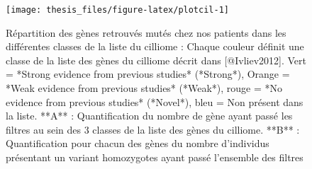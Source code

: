 \documentclass[12pt,twoside]{reedthesis}
\theoremstyle{definition}
\theoremstyle{definition}
\theoremstyle{remark}
\begin{document}
  \newpage 
  
  \begin{figure}
  
  {\centering \texttt{[image: thesis\_files/figure-latex/plotcil-1]} 
  
  }
  
  \caption[Répartition des gènes retrouvés mutés chez nos patients dans les différentes classes de la liste du cilliome]{Répartition des gènes retrouvés mutés chez nos patients dans les différentes classes de la liste du cilliome : Chaque couleur définit une classe de la liste des gènes du cilliome décrit dans [@Ivliev2012]. Vert = *Strong evidence from previous studies* (*Strong*), Orange = *Weak evidence from previous studies* (*Weak*), rouge = *No evidence from previous studies* (*Novel*), bleu = Non présent dans la liste. **A** : Quantification du nombre de gène ayant passé les filtres au sein des 3 classes de la liste des gènes du cilliome. **B** : Quantification pour chacun des gènes du nombre d'individus présentant un variant homozygotes ayant passé l'ensemble des filtres}\label{fig:plotcil}
  \end{figure}
  
  \newpage  
  
\end{document}
